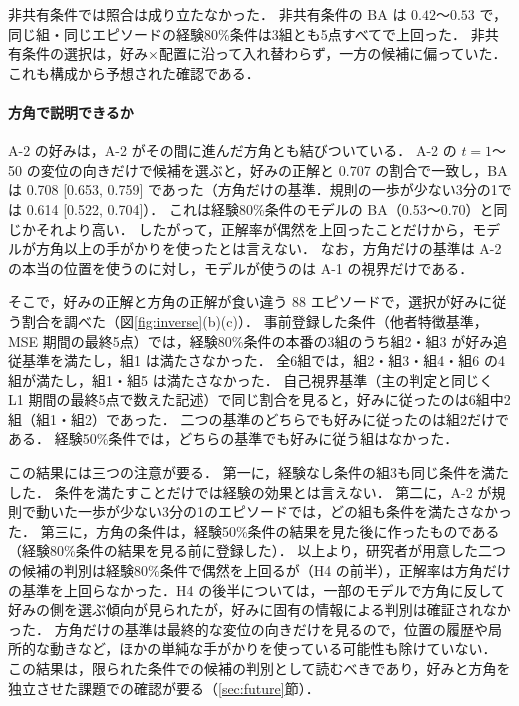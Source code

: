 非共有条件では照合は成り立たなかった．
非共有条件の BA は $0.42$〜$0.53$ で，同じ組・同じエピソードの経験80\%条件は3組とも5点すべてで上回った．
非共有条件の選択は，好み×配置に沿って入れ替わらず，一方の候補に偏っていた．
これも構成から予想された確認である．

\paragraph{方角で説明できるか}
A-2 の好みは，A-2 がその間に進んだ方角とも結びついている．
A-2 の $t=1$〜50 の変位の向きだけで候補を選ぶと，好みの正解と 0.707 の割合で一致し，BA は 0.708 [0.653, 0.759] であった（方角だけの基準．規則の一歩が少ない3分の1では 0.614 [0.522, 0.704]）．
これは経験80\%条件のモデルの BA（0.53〜0.70）と同じかそれより高い．
したがって，正解率が偶然を上回ったことだけから，モデルが方角以上の手がかりを使ったとは言えない．
なお，方角だけの基準は A-2 の本当の位置を使うのに対し，モデルが使うのは A-1 の視界だけである．

そこで，好みの正解と方角の正解が食い違う 88 エピソードで，選択が好みに従う割合を調べた（図\ref{fig:inverse}(b)(c)）．
事前登録した条件（他者特徴基準，MSE 期間の最終5点）では，経験80\%条件の本番の3組のうち組2・組3 が好み追従基準を満たし，組1 は満たさなかった．
全6組では，組2・組3・組4・組6 の4組が満たし，組1・組5 は満たさなかった．
自己視界基準（主の判定と同じく L1 期間の最終5点で数えた記述）で同じ割合を見ると，好みに従ったのは6組中2組（組1・組2）であった．
二つの基準のどちらでも好みに従ったのは組2だけである．
経験50\%条件では，どちらの基準でも好みに従う組はなかった．

この結果には三つの注意が要る．
第一に，経験なし条件の組3も同じ条件を満たした．
条件を満たすことだけでは経験の効果とは言えない．
第二に，A-2 が規則で動いた一歩が少ない3分の1のエピソードでは，どの組も条件を満たさなかった．
第三に，方角の条件は，経験50\%条件の結果を見た後に作ったものである（経験80\%条件の結果を見る前に登録した）．
以上より，研究者が用意した二つの候補の判別は経験80\%条件で偶然を上回るが（H4 の前半），正解率は方角だけの基準を上回らなかった．H4 の後半については，一部のモデルで方角に反して好みの側を選ぶ傾向が見られたが，好みに固有の情報による判別は確証されなかった．
方角だけの基準は最終的な変位の向きだけを見るので，位置の履歴や局所的な動きなど，ほかの単純な手がかりを使っている可能性も除けていない．
この結果は，限られた条件での候補の判別として読むべきであり，好みと方角を独立させた課題での確認が要る（\ref{sec:future}節）．

